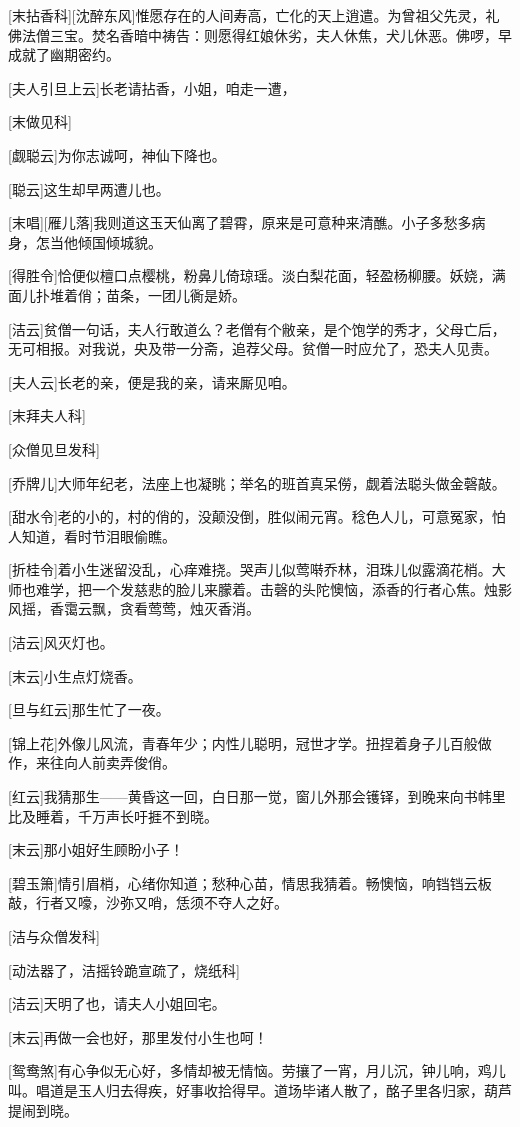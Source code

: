 \documentclass{book}
\begin{document}
[末拈香科][沈醉东风]惟愿存在的人间寿高，亡化的天上逍遣。为曾祖父先灵，礼佛法僧三宝。焚名香暗中祷告：则愿得红娘休劣，夫人休焦，犬儿休恶。佛啰，早成就了幽期密约。

[夫人引旦上云]长老请拈香，小姐，咱走一遭，

[末做见科]

[觑聪云]为你志诚呵，神仙下降也。

[聪云]这生却早两遭儿也。

[末唱][雁儿落]我则道这玉天仙离了碧霄，原来是可意种来清醮。小子多愁多病身，怎当他倾国倾城貌。

[得胜令]恰便似檀口点樱桃，粉鼻儿倚琼瑶。淡白梨花面，轻盈杨柳腰。妖娆，满面儿扑堆着俏；苗条，一团儿衠是娇。

[洁云]贫僧一句话，夫人行敢道么？老僧有个敝亲，是个饱学的秀才，父母亡后，无可相报。对我说，央及带一分斋，追荐父母。贫僧一时应允了，恐夫人见责。

[夫人云]长老的亲，便是我的亲，请来厮见咱。

[末拜夫人科]

[众僧见旦发科]

[乔牌儿]大师年纪老，法座上也凝眺；举名的班首真呆僗，觑着法聪头做金磬敲。

[甜水令]老的小的，村的俏的，没颠没倒，胜似闹元宵。稔色人儿，可意冤家，怕人知道，看时节泪眼偷瞧。

[折桂令]着小生迷留没乱，心痒难挠。哭声儿似莺啭乔林，泪珠儿似露滴花梢。大师也难学，把一个发慈悲的脸儿来朦着。击磬的头陀懊恼，添香的行者心焦。烛影风摇，香霭云飘，贪看莺莺，烛灭香消。

[洁云]风灭灯也。

[末云]小生点灯烧香。

[旦与红云]那生忙了一夜。

[锦上花]外像儿风流，青春年少；内性儿聪明，冠世才学。扭捏着身子儿百般做作，来往向人前卖弄俊俏。

[红云]我猜那生——黄昏这一回，白日那一觉，窗儿外那会镬铎，到晚来向书帏里比及睡着，千万声长吁捱不到晓。

[末云]那小姐好生顾盼小子！

[碧玉箫]情引眉梢，心绪你知道；愁种心苗，情思我猜着。畅懊恼，响铛铛云板敲，行者又嚎，沙弥又哨，恁须不夺人之好。

[洁与众僧发科]

[动法器了，洁摇铃跪宣疏了，烧纸科]

[洁云]天明了也，请夫人小姐回宅。

[末云]再做一会也好，那里发付小生也呵！

[鸳鸯煞]有心争似无心好，多情却被无情恼。劳攘了一宵，月儿沉，钟儿响，鸡儿叫。唱道是玉人归去得疾，好事收拾得早。道场毕诸人散了，酩子里各归家，葫芦提闹到晓。
\end{document}
